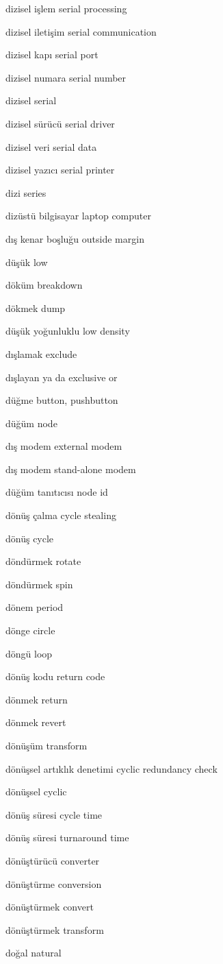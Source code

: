 \documentclass[12pt,fleqn]{article}\usepackage{../../common}
\begin{document}
dizisel işlem serial processing

dizisel iletişim serial communication

dizisel kapı serial port

dizisel numara serial number

dizisel serial

dizisel sürücü serial driver

dizisel veri serial data

dizisel yazıcı serial printer

dizi series

dizüstü bilgisayar laptop computer

dış kenar boşluğu outside margin

düşük low

döküm breakdown

dökmek dump

düşük yoğunluklu low density

dışlamak exclude

dışlayan ya da exclusive or

düğme button, pushbutton

düğüm node

dış modem external modem

dış modem stand-alone modem

düğüm tanıtıcısı node id

dönüş çalma cycle stealing

dönüş cycle

döndürmek rotate

döndürmek spin

dönem period

dönge circle

döngü loop

dönüş kodu return code

dönmek return

dönmek revert

dönüşüm transform

dönüşsel artıklık denetimi cyclic redundancy check

dönüşsel cyclic

dönüş süresi cycle time

dönüş süresi turnaround time

dönüştürücü converter

dönüştürme conversion

dönüştürmek convert

dönüştürmek transform

doğal natural
\end{document}
